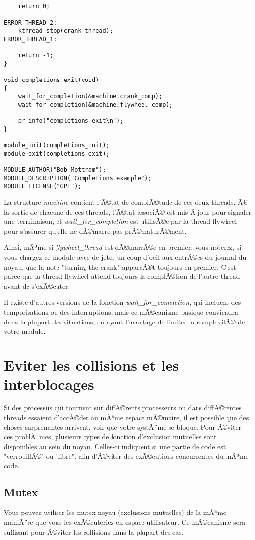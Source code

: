 \documentclass[11pt]{article}
\begin{document}
\begin{verbatim}
    return 0;

ERROR_THREAD_2:
    kthread_stop(crank_thread);
ERROR_THREAD_1:

    return -1;
}

void completions_exit(void)
{
    wait_for_completion(&machine.crank_comp);
    wait_for_completion(&machine.flywheel_comp);

    pr_info("completions exit\n");
}

module_init(completions_init);
module_exit(completions_exit);

MODULE_AUTHOR("Bob Mottram");
MODULE_DESCRIPTION("Completions example");
MODULE_LICENSE("GPL");
\end{verbatim}

La structure \emph{machine} contient l'Ã©tat de complÃ©tude de ces deux threads. Ã€ la sortie de chacune de ces threads, l'Ã©tat associÃ© est mis Ã  jour pour signaler une terminaison, et \emph{wait\_for\_completion} est utilisÃ©e par la thread flywheel pour s'assurer qu'elle ne dÃ©marre pas prÃ©maturÃ©ment.

Ainsi, mÃªme si \emph{flywheel\_thread} est dÃ©marrÃ©e en premier, vous noterez, si vous chargez ce module avec de jeter un coup d'oeil aux entrÃ©es du journal du noyau, que la note "turning the crank" apparaÃ®t toujours en premier. C'est parce que la thread flywheel attend toujours la complÃ©tion de l'autre thread avant de s'exÃ©cuter.

Il existe d'autres versions de la fonction \emph{wait\_for\_completion}, qui incluent des temporisations ou des interruptions, mais ce mÃ©canisme basique conviendra dans la plupart des situations, en ayant l'avantage de limiter la complexitÃ© de votre module.

\section*{Eviter les collisions et les interblocages}
\label{sec-12}
Si des processus qui tournent sur diffÃ©rents processeurs ou dans diffÃ©rentes threads essaient d'accÃ©der au mÃªme espace mÃ©moire, il est possible que des choses surprenantes arrivent, voir que votre systÃ¨me se bloque. Pour Ã©viter ces problÃ¨mes, plusieurs types de fonction d'exclusion mutuelles sont disponibles au sein du noyau. Celles-ci indiquent si une partie de code est "verrouillÃ©" ou "libre", afin d'Ã©viter des exÃ©cutions concurrentes du mÃªme code.

\subsection*{Mutex}
\label{sec-12-1}
Vous pouvez utiliser les mutex noyau (exclusions mutuelles) de la mÃªme maniÃ¨re que vous les exÃ©cuteriez en espace utilisateur. Ce mÃ©canisme sera suffisant pour Ã©viter les collisions dans la plupart des cas.
\end{document}
